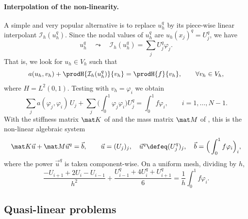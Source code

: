 \paragraph{Interpolation of the non-linearity.}
A simple and very popular alternative is to replace $u_h^q$ by its piece-wise linear interpolant $\mathcal I_h(u_h^q)$. Since the nodal values of $u_h^q$ are $u_h(x_j)^q = U_j^q$, we have
\begin{equation*}
    u_h^q \quad \leadsto \quad \mathcal I_h (u_h^q) = \sum_j U_j^q \varphi_j .
\end{equation*}
That is, we look for $u_h \in V_h$ such that
\begin{equation*}
    a(u_h, v_h) + \prodH{\mathcal I_h(u_h^q)}{v_h} = \prodH{f}{v_h}, \qquad \forall v_h \in V_h,
\end{equation*}
where $H = L^2(0,1)$.
Testing with $v_h = \varphi_i$ we obtain
\begin{equation*}
    \sum_j a(\varphi_j, \varphi_i)\, U_j + \sum_j \Big( \int_0^1 \varphi_j \varphi_i \Big) U_j^q = \int_0^1 f \varphi_i, \qquad i = 1, \dots, N-1.
\end{equation*}
With the stiffness matrix $\mat K$ of  and the mass matrix $\mat M$ of , this is the non-linear algebraic system
\begin{equation}
    \label{eq:Galerkin semilinear algebraic system}
    \mat K \vec u + \mat M \vec u^q = \vec b,
    \qquad
    \vec u = (U_j)_j, \quad \vec u^q \defeq (U_j^q)_j, \quad \vec b = \Big(\int_0^1 f \varphi_i\Big)_i ,
\end{equation}
where the power $\vec u^q$ is taken component-wise. On a uniform mesh, dividing by $h$,
\begin{equation*}
    \frac{-U_{i+1} + 2 U_i - U_{i-1}}{h^2} + \frac{U_{i-1}^q + 4 U_i^q + U_{i+1}^q}{6} = \frac 1 h \int_0^1 f \varphi_i .
\end{equation*}

\subsection{Quasi-linear problems}

